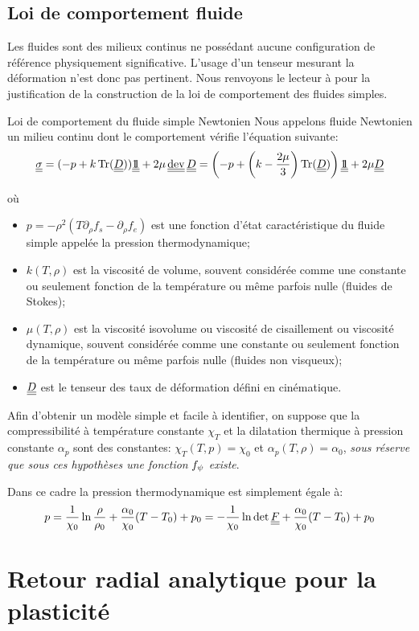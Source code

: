\documentclass[10pt]{book}
\begin{document}
\begin{appendices}
\section{Loi de comportement fluide}
Les fluides sont des milieux continus ne possédant aucune configuration de référence physiquement significative. L'usage d'un tenseur mesurant la déformation n'est donc pas pertinent. Nous renvoyons le lecteur à \cite{garrigues2017comportement} pour la justification de la construction de la loi de comportement des fluides simples. 
\begin{Hypothese}{Loi de comportement du fluide simple Newtonien} Nous appelons fluide Newtonien un milieu continu dont le comportement vérifie l'équation suivante:
$$\SC=(-p+k\tr(\TD))\TU+2\mu\dev\TD=\left(-p+\left(k-\frac{2\mu}{3}\right)\tr(\TD)\right)\TU+2\mu \TD$$
\end{Hypothese}
où
\begin{itemize}[label=-]
\item $p=-\rho^{2}(T\partial_{\rho}f_{s}-\partial_{\rho}f_{e})$ est une fonction d'état caractéristique du fluide simple appelée la pression thermodynamique;
\item $k(T,\rho)$ est la viscosité de volume, souvent considérée comme une constante ou seulement fonction de la température ou même parfois nulle (fluides de Stokes);
\item $\mu(T,\rho)$ est la viscosité isovolume ou viscosité de cisaillement ou viscosité dynamique, souvent considérée comme une constante ou seulement fonction de la température ou même parfois nulle (fluides non visqueux);
\item $\underline{\underline{D}}$ est le tenseur des taux de déformation défini en cinématique.
\end{itemize}
\begin{Hypothese}{}\label{Hyp:6_8} Afin d'obtenir un modèle simple et facile à identifier, on suppose que la compressibilité à température constante $\chi_{T}$ et la dilatation thermique à pression constante $\alpha_{p}$ sont des constantes: $\chi_{T}(T,p)=\chi_{0}$ et $\alpha_{p}(T,\rho)=\alpha_{0}$, \emph{sous réserve que sous ces hypothèses une fonction} $f_{\psi}$ \emph{existe}.
\end{Hypothese}
Dans ce cadre la pression thermodynamique est simplement égale à:
$$p=\frac{1}{\chi_{0}}\ln\frac{\rho}{\rho_{0}}+\frac{\alpha_{0}}{\chi_{0}}(T-T_{0})+p_{0}=-\frac{1}{\chi_{0}}\ln\det\underline{\underline{F}}+\frac{\alpha_{0}}{\chi_{0}}(T-T_{0})+p_{0}$$
\chapter{Retour radial analytique pour la plasticité}

\end{appendices}
\end{document}
